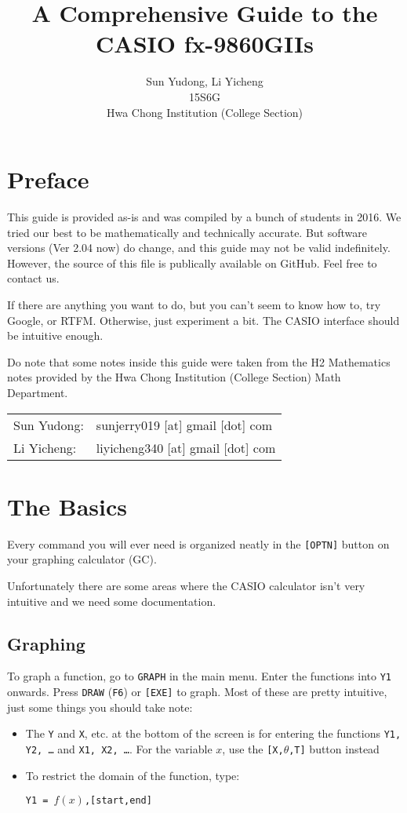 \documentclass[a5paper,draft]{memoir}
\title{A Comprehensive Guide to the CASIO fx-9860GIIs}
\author{Sun Yudong, Li Yicheng \\ 15S6G \\ Hwa Chong Institution (College Section)}
\def\code#1{\texttt{#1}}
\begin{document}
\begin{titlingpage}
	\maketitle
\end{titlingpage}

\frontmatter

\tableofcontents

\chapter{Preface}
This guide is provided as-is and was compiled by a bunch of students in 2016. We tried our best to be mathematically and technically accurate. But software versions (Ver 2.04 now) do change, and this guide may not be valid indefinitely. However, the source of this file is publically available on GitHub. Feel free to contact us.

If there are anything you want to do, but you can't seem to know how to, try Google, or RTFM. Otherwise, just experiment a bit. The CASIO interface should be intuitive enough.

Do note that some notes inside this guide were taken from the H2 Mathematics notes provided by the Hwa Chong Institution (College Section) Math Department. 

\vspace{0.7cm}

\begin{tabular}{l l}
	Sun Yudong: & sunjerry019 [at] gmail [dot] com \\
	Li Yicheng: & liyicheng340 [at] gmail [dot] com 
\end{tabular}


\mainmatter
\chapter{The Basics}
Every command you will ever need is organized neatly in the \code{[OPTN]} button on your graphing calculator (GC).

Unfortunately there are some areas where the CASIO calculator isn't very intuitive and we need some documentation.

\section{Graphing} \label{graphing}
To graph a function, go to \code{GRAPH} in the main menu. Enter the functions into \code{Y1} onwards. Press \code{DRAW} (\code{F6}) or \code{[EXE]} to graph. Most of these are pretty intuitive, just some things you should take note:
\begin{itemize}
	\item The \code{Y} and \code{X}, etc. at the bottom of the screen is for entering the functions \code{Y1, Y2, \dots} and \code{X1, X2, \dots}. For the variable $x$, use the \code{[X,$\theta$,T]} button instead
	\item To restrict the domain of the function, type:
	\begin{center}
		\code{Y1 = $f(x)$,[start,end]}
	\end{center}
\end{itemize}
\end{document}
